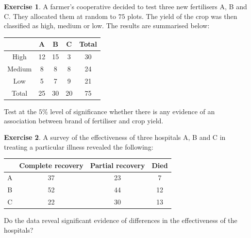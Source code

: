 \documentclass[
]{book}
\theoremstyle{definition}
\theoremstyle{definition}
\theoremstyle{definition}
\newtheorem{exercise}{Exercise}[chapter]
\theoremstyle{definition}
\theoremstyle{remark}
\begin{document}
\begin{exercise}
A farmer's cooperative decided to test three new fertilisers A, B and C. They allocated them at random to \(75\) plots. The yield of the crop was then classified as high, medium or low. The results are summarised below:

\begin{longtable}[]{@{}ccccc@{}}
\toprule
& A & B & C & Total\tabularnewline
\midrule
\endhead
High & 12 & 15 & 3 & 30\tabularnewline
Medium & 8 & 8 & 8 & 24\tabularnewline
Low & 5 & 7 & 9 & 21\tabularnewline
Total & 25 & 30 & 20 & 75\tabularnewline
\bottomrule
\end{longtable}

Test at the \(5\%\) level of significance whether there is any evidence of an association between brand of fertiliser and crop yield.
\end{exercise}

\begin{exercise}
A survey of the effectiveness of three hospitals A, B and C in treating a particular illness revealed the following:

\begin{longtable}[]{@{}cccc@{}}
\toprule
& Complete recovery & Partial recovery & Died\tabularnewline
\midrule
\endhead
A & 37 & 23 & 7\tabularnewline
B & 52 & 44 & 12\tabularnewline
C & 22 & 30 & 13\tabularnewline
\bottomrule
\end{longtable}

Do the data reveal significant evidence of differences in the effectiveness of the hospitals?
\end{exercise}

  
\end{document}
